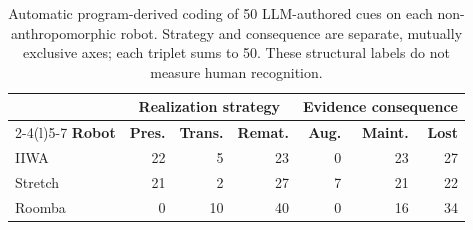\begin{table}[t]
\centering
\small
\setlength{\tabcolsep}{3.5pt}
\renewcommand{\arraystretch}{1.08}
\begin{tabular}{@{}lrrr|rrr@{}}
\toprule
& \multicolumn{3}{c}{\textbf{Realization strategy}} & \multicolumn{3}{c}{\textbf{Evidence consequence}} \\
\cmidrule(lr){2-4}\cmidrule(l){5-7}
\textbf{Robot} & \textbf{Pres.} & \textbf{Trans.} & \textbf{Remat.} & \textbf{Aug.} & \textbf{Maint.} & \textbf{Lost} \\
\midrule
IIWA & 22 & 5 & 23 & 0 & 23 & 27 \\
Stretch & 21 & 2 & 27 & 7 & 21 & 22 \\
Roomba & 0 & 10 & 40 & 0 & 16 & 34 \\
\bottomrule
\end{tabular}
\caption{Automatic program-derived coding of 50 LLM-authored cues on each non-anthropomorphic robot. Strategy and consequence are separate, mutually exclusive axes; each triplet sums to 50. These structural labels do not measure human recognition.}
\label{tab:nonanthro-transfer-50}
\end{table}
